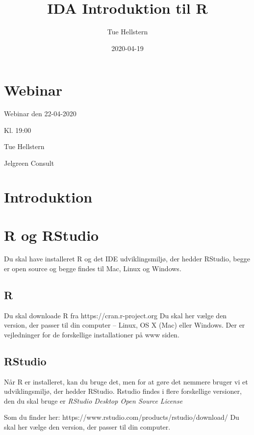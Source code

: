 \documentclass[
]{book}
\title{IDA Introduktion til R}
\author{Tue Hellstern}
\date{2020-04-19}
\begin{document}
\maketitle

{
\setcounter{tocdepth}{1}
\tableofcontents
}
\hypertarget{webinar}{%
\chapter{Webinar}\label{webinar}}

Webinar den 22-04-2020

Kl. 19:00

Tue Hellstern

Jelgreen Consult

\hypertarget{intro}{%
\chapter{Introduktion}\label{intro}}

\hypertarget{R_RStudio}{%
\chapter{R og RStudio}\label{R_RStudio}}

Du skal have installeret R og det IDE udviklingsmiljø, der hedder RStudio, begge er open source og begge findes til Mac, Linux og Windows.

\hypertarget{r}{%
\section{R}\label{r}}

Du skal downloade R fra
https://cran.r-project.org
Du skal her vælge den version, der passer til din computer -- Linux, OS X (Mac) eller Windows.
Der er vejledninger for de forskellige installationer på www siden.

\hypertarget{rstudio}{%
\section{RStudio}\label{rstudio}}

Når R er installeret, kan du bruge det, men for at gøre det nemmere bruger vi et udviklingsmiljø, der hedder RStudio. Rstudio findes i flere forskellige versioner, den du skal bruge er \emph{RStudio Desktop Open Source License}

Som du finder her: https://www.rstudio.com/products/rstudio/download/
Du skal her vælge den version, der passer til din computer.
\end{document}
